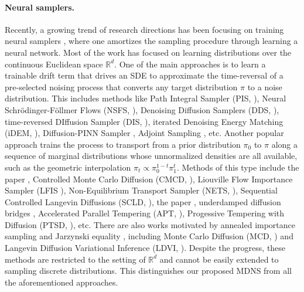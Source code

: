 \documentclass{article}
\theoremstyle{remark}
\newcommand{\R}{\mathbb{R}}
\begin{document}
\paragraph{Neural samplers.} Recently, a growing trend of research directions has been focusing on training neural samplers \cite{noe2019boltzmann, he2025no}, where one amortizes the sampling procedure through learning a neural network. Most of the work has focused on learning distributions over the continuous Euclidean space $\R^d$. One of the main approaches is to learn a trainable drift term that drives an SDE to approximate the time-reversal of a pre-selected noising process that converts any target distribution $\pi$ to a noise distribution. This includes methods like Path Integral Sampler (PIS, \cite{zhang2022path}), Neural Schr\"odinger-F\"ollmer Flows (NSFS, \cite{vargas2023bayesian}), Denoising Diffusion Samplers (DDS, \cite{vargas2023denoising}), time-reversed DIffusion Sampler (DIS, \cite{berner2022an}), iterated Denoising Energy Matching (iDEM, \cite{akhoundsadegh2024iterated}), Diffusion-PINN Sampler \cite{shi2024diffusion}, Adjoint Sampling \cite{havens2025adjoint,liu2025adjoint, choi2025non}, etc. Another popular approach trains the process to transport from a prior distribution $\pi_0$ to $\pi$ along a sequence of marginal distributions whose unnormalized densities are all available, such as the geometric interpolation $\pi_t\propto\pi_0^{1-t}\pi_1^t$. Methods of this type include the paper \cite{mate2023learning}, Controlled Monte Carlo Diffusion (CMCD, \cite{vargas2024transport}),  Liouville Flow Importance Sampler (LFIS \cite{tian2024liouville}), Non-Equilibrium Transport Sampler (NETS, \cite{ albergo2025nets}), Sequential Controlled Langevin Diffusions (SCLD, \cite{chen2025sequential}), the paper \cite{chemseddine2025neural}, underdamped diffusion bridges \cite{blessing2025underdamped}, Accelerated Parallel Tempering (APT, \cite{zhang2025accelerated}), Progessive Tempering with Diffusion (PTSD, \cite{rissanen2025progressive}), etc. There are also works motivated by annealed importance sampling \cite{neal2001annealed} and Jarzynski equality \cite{jarzynski1997nonequilibrium,vaikuntanathan2008escorted}, including Monte Carlo Diffusion (MCD, \cite{doucet2022score}) and Langevin Diffusion Variational Inference (LDVI, \cite{geffner2023langevin}). Despite the progress, these methods are restricted to the setting of $\R^d$ and cannot be easily extended to sampling discrete distributions. This distinguishes our proposed MDNS from all the aforementioned approaches.
\end{document}
